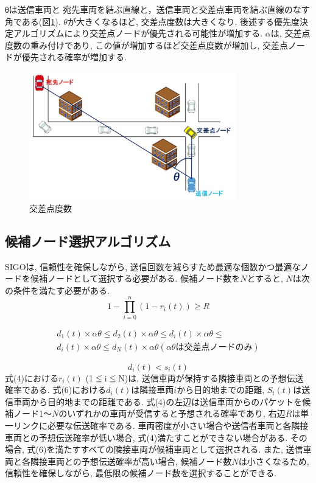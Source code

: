 \documentclass[technicalreport]{ieicej}
\begin{document}
  θは送信車両と 宛先車両を結ぶ直線と，送信車両と交差点車両を結ぶ直線のなす角である(図\ref{fig:Intersection}). 
  $θ$が大きくなるほど, 交差点度数は大きくなり, 後述する優先度決定アルゴリズムにより交差点ノードが優先される可能性が増加する. $α$は, 交差点度数の重み付けであり, この値が増加するほど交差点度数が増加し, 交差点ノードが優先される確率が増加する. 
 
 \begin{figure}[!ht]
\centering
\includegraphics[width=90mm]{figures/Intersection.eps}
\caption{交差点度数}
\label{fig:Intersection}
\end{figure}

\subsection{候補ノード選択アルゴリズム}
SIGOは, 信頼性を確保しながら, 送信回数を減らすため最適な個数かつ最適なノードを候補ノードとして選択する必要がある. 候補ノード数を$N$とすると, $N$は次の条件を満たす必要がある. 
\begin{equation}
1 - \prod_{i=0}^n (1 - r_{i}(t))\geq R
\end{equation}

\begin{eqnarray}
d_{1}(t) \times αθ \leq   d_{2}(t) \times αθ \leq   d_{i}(t)  \times αθ  \leq \nonumber \\ 
d_{i}(t) \times αθ   \leq  d_{N}(t)  \times αθ \left(αθは交差点ノードのみ\right)
\end{eqnarray}

\begin{equation}d_{i}(t) < s_{i}(t)
\end{equation}
式(4)における$r_{i}(t)$ (1$ \leqq $i$ \leqq $N)は, 送信車両が保持する隣接車両との予想伝送確率である. 式(6)における$d_{i}(t)$は隣接車両$i$から目的地までの距離, $S_{t}(t)$は送信車両から目的地までの距離である. 
式(4)の左辺は送信車両からのパケットを候補ノード1～$N$のいずれかの車両が受信すると予想される確率であり, 右辺$R$は単一リンクに必要な伝送確率である. 車両密度が小さい場合や送信者車両と各隣接車両との予想伝送確率が低い場合, 式(4)満たすことができない場合がある. その場合, 式(6)を満たすすべての隣接車両が候補車両として選択される. また, 送信車両と各隣接車両との予想伝送確率が高い場合, 候補ノード数$N$は小さくなるため, 信頼性を確保しながら, 最低限の候補ノード数を選択することができる. 
\end{document}
